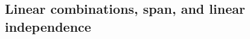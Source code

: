 \documentclass{article}
\begin{document}
\maketitle

\subsection{Linear combinations, span, and linear independence}
\end{document}
